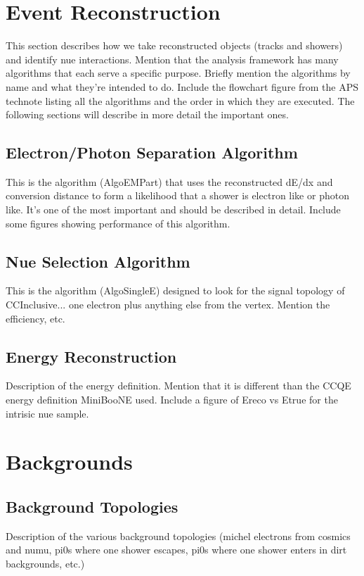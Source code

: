 \section{Event Reconstruction}
This section describes how we take reconstructed objects (tracks and showers) and identify nue interactions. Mention that the analysis framework has many algorithms that each serve a specific purpose. Briefly mention the algorithms by name and what they're intended to do. Include the flowchart figure from the APS technote listing all the algorithms and the order in which they are executed. The following sections will describe in more detail the important ones. 

\subsection{Electron/Photon Separation Algorithm}
This is the algorithm (AlgoEMPart) that uses the reconstructed dE/dx and conversion distance to form a likelihood that a shower is electron like or photon like. It's one of the most important and should be described in detail. Include some figures showing performance of this algorithm.

\subsection{Nue Selection Algorithm}
This is the algorithm (AlgoSingleE) designed to look for the signal topology of CCInclusive... one electron plus anything else from the vertex. Mention the efficiency, etc.

\subsection{Energy Reconstruction}
Description of the energy definition. Mention that it is different than the CCQE energy definition MiniBooNE used. Include a figure of Ereco vs Etrue for the intrisic nue sample.



\section{Backgrounds}

\subsection{Background Topologies}
Description of the various background topologies (michel electrons from cosmics and numu, pi0s where one shower escapes, pi0s where one shower enters in dirt backgrounds, etc.)

